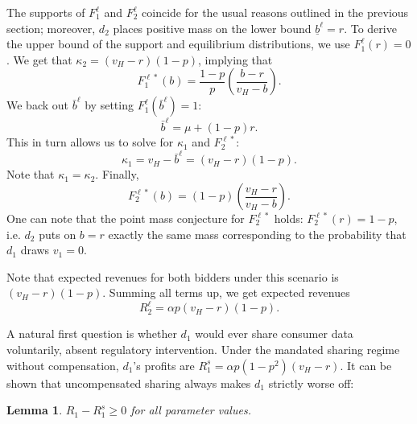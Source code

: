 \documentclass[11pt]{article}
\theoremstyle{plain}
\theoremstyle{definition}
\theoremstyle{plain}
\theoremstyle{plain}
\theoremstyle{plain}
\newtheorem{lem}[thm]{Lemma}
\theoremstyle{plain}
\numberwithin{equation}{section}
\begin{document}
\noindent The supports of $F_1^{\ell}$ and $F_2^{\ell}$ coincide for the usual reasons outlined in the previous section; moreover, $d_2$ places positive mass on the lower bound $\underline{b}^\ell = r$. To derive the upper bound of the support and equilibrium distributions, we use $F_1^{\ell}(r) = 0$. We get that $\kappa_2 = (v_H-r)(1-p)$, implying that 
\begin{equation*}
    F_1^{\ell *}(b) = \frac{1-p}{p} \left( \frac{b-r}{v_H-b} \right).
\end{equation*}
We back out $\bar{b}^\ell$ by setting $ F_1^{\ell}(\bar{b}^\ell) = 1$:
\begin{equation*}
    \bar{b}^\ell = \mu+(1-p)r.
\end{equation*}
This in turn allows us to solve for $\kappa_1$ and $F_2^{\ell *}$:
\begin{equation*}
    \kappa_1 = v_H- \bar{b}^\ell = (v_H-r)(1-p).
\end{equation*}
Note that $\kappa_1 = \kappa_2$. Finally,
\begin{equation*}
    F_2^{\ell *}(b) = (1-p)\left(\frac{v_H-r}{v_H-b}\right).
\end{equation*}
One can note that the point mass conjecture for $F_2^{\ell *}$ holds: $F_2^{\ell *}(r) = 1-p$, i.e. $d_2$ puts on $b = r$ exactly the same mass corresponding to the probability that $d_1$ draws $v_1 = 0$. \par 
\vspace{2mm}
\noindent Note that expected revenues for both bidders under this scenario is $(v_H-r)(1-p)$. Summing all terms up, we get expected revenues
\begin{equation*}
    R_2^\ell = \alpha p (v_H-r)(1-p).
\end{equation*}

\noindent A natural first question is whether $d_1$ would ever share consumer data voluntarily, absent regulatory intervention. Under the mandated sharing regime without compensation, $d_1$'s profits are $R_1^s = \alpha p (1-p^2)(v_H-r)$. It can be shown that uncompensated sharing always makes $d_1$ strictly worse off:
\begin{lem}\label{no-sharing}
    $R_1 - R_1^s \geq0$ for all parameter values.
\end{lem}
\vspace{2mm}
\end{document}
